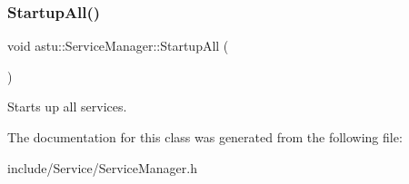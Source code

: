 \subsubsection{\texorpdfstring{Startup\+All()}{StartupAll()}}
{\footnotesize\ttfamily void astu\+::\+Service\+Manager\+::\+Startup\+All (\begin{DoxyParamCaption}{ }\end{DoxyParamCaption})}

Starts up all services. 

The documentation for this class was generated from the following file\+:\begin{DoxyCompactItemize}
\item 
include/\+Service/Service\+Manager.\+h\end{DoxyCompactItemize}
